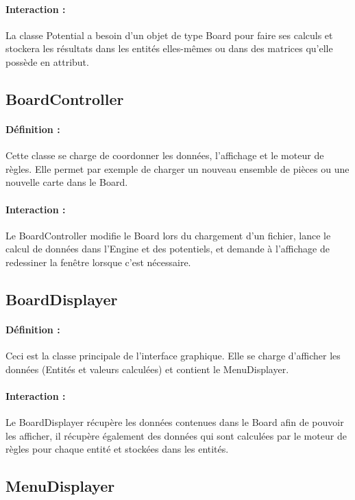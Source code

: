 			\paragraph{Interaction :}
			La classe Potential a besoin d'un objet de type Board pour faire ses calculs et stockera les résultats dans les 
			entités elles-mêmes ou dans des matrices qu'elle possède en attribut.

		\subsection*{BoardController}

			\paragraph{Définition :}
			Cette classe se charge de coordonner les données, l'affichage et le moteur de règles. Elle permet par exemple de charger un nouveau ensemble de pièces ou 
			une nouvelle carte dans le Board.
			\paragraph{Interaction :}
			Le BoardController modifie le Board lors du chargement d'un fichier, lance le calcul de données dans l'Engine et des potentiels, et demande à l'affichage
			de redessiner la fenêtre lorsque c'est nécessaire.

		\subsection*{BoardDisplayer}

			\paragraph{Définition :}
			Ceci est la classe principale de l'interface graphique. Elle se charge d'afficher les données (Entités et valeurs calculées)
			et contient le MenuDisplayer.
			\paragraph{Interaction :}
			Le BoardDisplayer récupère les données contenues dans le Board afin de pouvoir les afficher, il récupère également des données qui sont calculées
			par le moteur de règles pour chaque entité et stockées dans les entités.

		\subsection*{MenuDisplayer}

